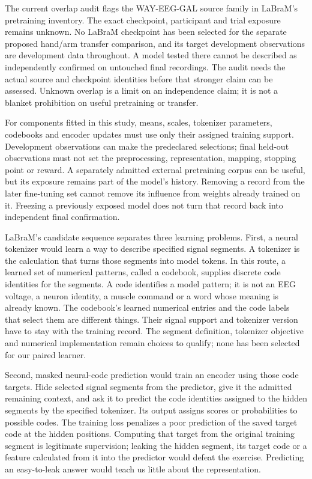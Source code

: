 The current overlap audit flags the WAY-EEG-GAL source family in LaBraM's
pretraining inventory. The exact checkpoint, participant and trial exposure
remains unknown. No LaBraM checkpoint has been selected for the separate
proposed hand/arm transfer comparison, and its target development observations
are development data throughout. A model tested there cannot be described as
independently confirmed on untouched final recordings. The audit needs the
actual source and checkpoint identities before that stronger claim can be
assessed. Unknown overlap is a limit on an independence claim; it is not a
blanket prohibition on useful pretraining or transfer.

For components fitted in this study, means, scales, tokenizer parameters,
codebooks and encoder updates must use only their assigned training support.
Development observations can make the predeclared selections; final held-out
observations must not set the preprocessing, representation, mapping, stopping
point or reward. A separately admitted external pretraining corpus can be
useful, but its exposure remains part of the model's history. Removing a record
from the later fine-tuning set cannot remove its influence from weights already
trained on it. Freezing a previously exposed model does not turn that record
back into independent final confirmation.

LaBraM's candidate sequence separates three learning problems. First, a neural
tokenizer would learn a way to describe specified signal segments. A tokenizer
is the calculation that turns those segments into model tokens. In this route,
a learned set of numerical patterns, called a codebook, supplies discrete
code identities for the segments. A code identifies a model pattern; it is not
an EEG voltage, a neuron identity, a muscle command or a word whose meaning is
already known. The codebook's learned numerical entries and the code labels
that select them are different things. Their signal support and tokenizer
version have to stay with the training record. The segment definition,
tokenizer objective and numerical implementation remain choices to qualify;
none has been selected for our paired learner.

Second, masked neural-code prediction would train an encoder using those code
targets. Hide selected signal segments from the predictor, give it the admitted
remaining context, and ask it to predict the code identities assigned to the
hidden segments by the specified tokenizer. Its output assigns scores or
probabilities to possible codes. The training loss penalizes a poor prediction
of the saved target code at the hidden positions. Computing that target from
the original training segment is legitimate supervision; leaking the hidden
segment, its target code or a feature calculated from it into the predictor
would defeat the exercise. Predicting an easy-to-leak answer would teach us
little about the representation.

